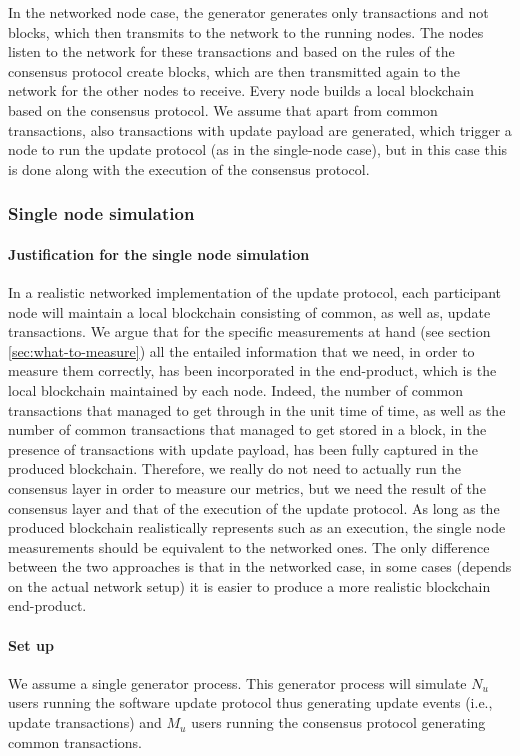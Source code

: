 In the networked node case, the generator generates only transactions and not
blocks, which then transmits to the network to the running nodes. The nodes
listen to the network for these transactions and based on the rules of the
consensus protocol create blocks, which are then transmitted again to the
network for the other nodes to receive. Every node builds a local blockchain
based on the consensus protocol. We assume that apart from common transactions,
also transactions with update payload are generated, which trigger a node to run
the update protocol (as in the single-node case), but in this case this is done
along with the execution of the consensus protocol.

\subsubsection{Single node simulation}
\paragraph{Justification for the single node simulation}
In a realistic networked implementation of the update protocol, each participant
node will maintain a local blockchain consisting of common, as well as, update
transactions. We argue that for the specific measurements at hand (see section
\ref{sec:what-to-measure}) all the entailed information that we need, in order
to measure them correctly, has been incorporated in the end-product, which is
the local blockchain maintained by each node. Indeed, the number of common
transactions that managed to get through in the unit time of time, as well as
the number of common transactions that managed to get stored in a block, in the
presence of transactions with update payload, has been fully captured in the
produced blockchain. Therefore, we really do not need to actually run the
consensus layer in order to measure our metrics, but we need the result of the
consensus layer and that of the execution of the update protocol. As long as the
produced blockchain realistically represents such as an execution, the single
node measurements should be equivalent to the networked ones. The only
difference between the two approaches is that in the networked case, in some
cases (depends on the actual network setup) it is easier to produce a more
realistic blockchain end-product.

\paragraph{Set up}
We assume a single generator process. This generator process will simulate $N_u$
users running the software update protocol thus generating update events (i.e.,
update transactions) and $M_u$ users running the consensus protocol generating
common transactions.

